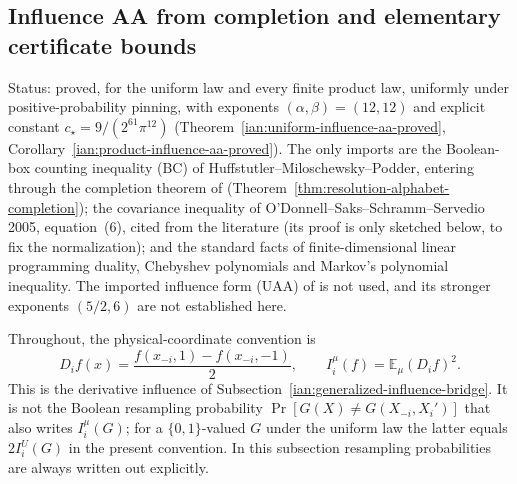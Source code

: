 \subsection{Influence AA from completion and elementary certificate bounds}
\label{ian:influence-form-uniform-aa}

Status: proved, for the uniform law and every finite product law, uniformly under positive-probability pinning, with exponents \((\alpha,\beta)=(12,12)\) and explicit constant \(c_\star=9/(2^{61}\pi^{12})\) (Theorem~\ref{ian:uniform-influence-aa-proved}, Corollary~\ref{ian:product-influence-aa-proved}). The only imports are the Boolean-box counting inequality (BC) of Huffstutler--Miloschewsky--Podder, entering through the completion theorem of  (Theorem~\ref{thm:resolution-alphabet-completion}); the covariance inequality of O'Donnell--Saks--Schramm--Servedio 2005, equation~(6), cited from the literature (its proof is only sketched below, to fix the normalization); and the standard facts of finite-dimensional linear programming duality, Chebyshev polynomials and Markov's polynomial inequality. The imported influence form (UAA) of  is not used, and its stronger exponents \((5/2,6)\) are not established here.

Throughout, the physical-coordinate convention is
\[
 D_i f(x)=\frac{f(x_{-i},1)-f(x_{-i},-1)}2,\qquad
 I_i^\mu(f)=\mathbb E_\mu(D_i f)^2.
\]
This is the derivative influence of
Subsection~\ref{ian:generalized-influence-bridge}. It is not the
Boolean resampling probability
\(\Pr[G(X)\ne G(X_{-i},X_i')]\) that
 also writes \(I_i^\mu(G)\);
for a \(\{0,1\}\)-valued \(G\) under the uniform law the latter equals
\(2I_i^{U}(G)\) in the present convention. In this subsection
resampling probabilities are always written out explicitly.

